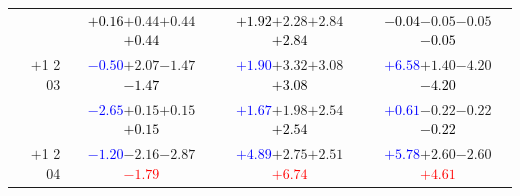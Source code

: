 \documentclass[compress]{beamer}
\begin{document}
\begin{frame}
\begin{tabular}{r | c | c | c}
          & \textcolor{black}{$+0.16$}\hspace{0.1 cm}$+0.44$\hspace{0.1 cm}$+0.44$\hspace{0.1 cm}\textcolor{black}{$+0.44$} & \textcolor{black}{$+1.92$}\hspace{0.1 cm}$+2.28$\hspace{0.1 cm}$+2.84$\hspace{0.1 cm}\textcolor{black}{$+2.84$} & \textcolor{black}{$-0.04$}\hspace{0.1 cm}$-0.05$\hspace{0.1 cm}$-0.05$\hspace{0.1 cm}\textcolor{black}{$-0.05$} \\
$+$1 2 03 & \textcolor{blue}{$-0.50$}\hspace{0.1 cm}$+2.07$\hspace{0.1 cm}$-1.47$\hspace{0.1 cm}\textcolor{black}{$-1.47$} & \textcolor{blue}{$+1.90$}\hspace{0.1 cm}$+3.32$\hspace{0.1 cm}$+3.08$\hspace{0.1 cm}\textcolor{black}{$+3.08$} & \textcolor{blue}{$+6.58$}\hspace{0.1 cm}$+1.40$\hspace{0.1 cm}$-4.20$\hspace{0.1 cm}\textcolor{black}{$-4.20$} \\
          & \textcolor{blue}{$-2.65$}\hspace{0.1 cm}$+0.15$\hspace{0.1 cm}$+0.15$\hspace{0.1 cm}\textcolor{black}{$+0.15$} & \textcolor{blue}{$+1.67$}\hspace{0.1 cm}$+1.98$\hspace{0.1 cm}$+2.54$\hspace{0.1 cm}\textcolor{black}{$+2.54$} & \textcolor{blue}{$+0.61$}\hspace{0.1 cm}$-0.22$\hspace{0.1 cm}$-0.22$\hspace{0.1 cm}\textcolor{black}{$-0.22$} \\
$+$1 2 04 & \textcolor{blue}{$-1.20$}\hspace{0.1 cm}$-2.16$\hspace{0.1 cm}$-2.87$\hspace{0.1 cm}\textcolor{red}{$-1.79$} & \textcolor{blue}{$+4.89$}\hspace{0.1 cm}$+2.75$\hspace{0.1 cm}$+2.51$\hspace{0.1 cm}\textcolor{red}{$+6.74$} & \textcolor{blue}{$+5.78$}\hspace{0.1 cm}$+2.60$\hspace{0.1 cm}$-2.60$\hspace{0.1 cm}\textcolor{red}{$+4.61$} \\

\end{tabular}
\end{frame}
\end{document}
